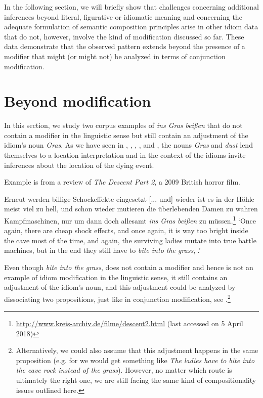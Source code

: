 \documentclass[output=paper]{langsci/langscibook}
\begin{document}
In the following section, we will briefly show that challenges concerning additional inferences beyond literal, figurative or idiomatic meaning and concerning the adequate formulation of semantic composition principles arise in other idiom data that do not, however, involve the kind of modification discussed so far. These data demonstrate that the observed pattern extends beyond the presence of a modifier that might (or might not) be analyzed in terms of conjunction modification.



\section{Beyond modification} \label{Beyond Mod}
In this section, we study two corpus examples of \textit{ins Gras beißen} that do not contain a modifier in the linguistic sense but still contain an adjustment of the idiom's noun \textit{Gras}. As we have seen in , , , , and , the nouns \textit{Gras} and \textit{dust} lend themselves to a location interpretation and in the context of the idioms invite inferences about the location of the dying event.

Example  is from a review of \textit{The Descent Part 2}, a 2009 British horror film.

\ea \label{cave rock}
Erneut werden billige Schockeffekte eingesetzt [... und] wieder ist es in der Höhle meist viel zu hell, und schon wieder mutieren die überlebenden Damen zu wahren Kampfmaschinen, nur um dann doch allesamt \textit{ins Gras} \underline{} \textit{beißen} zu müssen.\footnote{\url{http://www.kreis-archiv.de/filme/descent2.html} (last accessed on 5 April 2018)}
\glt `Once again, there are cheap shock effects, and once again, it is way too bright inside the cave most of the time, and again, the surviving ladies mutate into true battle machines, but in the end they still have to \textit{bite into the grass}, \underline{}.'
\z

\noindent Even though \textit{bite into the grass}, \underline{} does not contain a modifier and hence is not an example of idiom modification in the linguistic sense, it still contains an adjustment of the idiom's noun, and this adjustment could be analyzed by dissociating two propositions, just like in conjunction modification, see .\footnote{Alternatively, we could also assume that this adjustment happens in the same proposition (e.g. for  we would get something like \textit{The ladies have to bite into the cave rock instead of the grass}). However, no matter which route is ultimately the right one, we are still facing the same kind of compositionality issues outlined here.}
\end{document}
